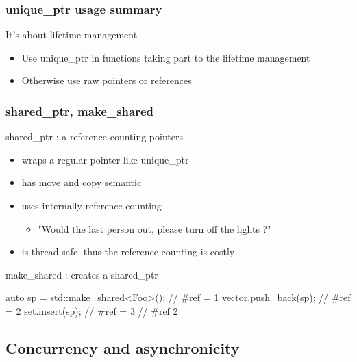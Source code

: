 \begin{frame}[fragile]
  \frametitle{unique\_ptr usage summary}
  \begin{block}{It's about lifetime management}
    \begin{itemize}
    \item Use unique\_ptr in functions taking part to the lifetime management
    \item Otherwise use raw pointers or references
    \end{itemize}
  \end{block}
\end{frame}

\begin{frame}[fragile]
  \frametitle{shared\_ptr, make\_shared}
  \begin{block}{shared\_ptr : a reference counting pointers}
    \begin{itemize}
    \item wraps a regular pointer like unique\_ptr
    \item has move and copy semantic
    \item uses internally reference counting
      \begin{itemize}
      \item "Would the last person out, please turn off the lights ?"
      \end{itemize}
    \item is thread safe, thus the reference counting is costly
    \end{itemize}
  \end{block}
  \begin{block}{make\_shared : creates a shared\_ptr}
    \begin{cppcode*}{}
      {
        auto sp = std::make_shared<Foo>(); // #ref = 1
        vector.push_back(sp);              // #ref = 2
        set.insert(sp);                    // #ref = 3
      } // #ref 2
    \end{cppcode*}
  \end{block}
\end{frame}

\subsection[thread]{Concurrency and asynchronicity}

